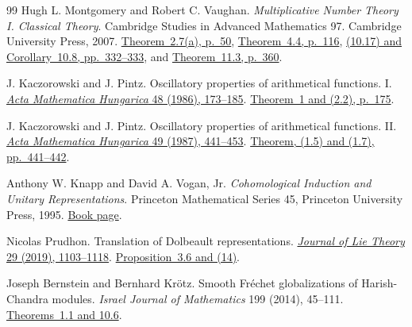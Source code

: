 \begin{thebibliography}{99}
Hugh L. Montgomery and Robert C. Vaughan.
\emph{Multiplicative Number Theory I. Classical Theory}.
Cambridge Studies in Advanced Mathematics 97. Cambridge University Press, 2007.
\href{https://personal.science.psu.edu/rcv4/personal/Publications/MNTI/06.0_pp_35_75_The_elementary_theory_of_arithmetic_functions.pdf\#page=16}
{Theorem~2.7(a), p.~50},
\href{https://personal.science.psu.edu/rcv4/personal/Publications/MNTI/08.0_pp_108_136_Primes_in_arithmetic_progressions_I.pdf\#page=9}
{Theorem~4.4, p.~116},
\href{https://personal.science.psu.edu/rcv4/personal/Publications/MNTI/14.0_pp_326_357_Analytic_properties_of_the_zeta_function_and_L-functions.pdf\#page=7}
{(10.17) and Corollary~10.8, pp.~332--333}, and
\href{https://personal.science.psu.edu/rcv4/personal/Publications/MNTI/15.0_pp_358_396_Primes_in_arithmetic_progressions_II.pdf\#page=3}
{Theorem~11.3, p.~360}.

J. Kaczorowski and J. Pintz.
Oscillatory properties of arithmetical functions. I.
\href{https://doi.org/10.1007/BF01949062}
{\emph{Acta Mathematica Hungarica} 48 (1986), 173--185}.
\href{https://personal.math.ubc.ca/~gerg/teaching/592-Fall2018/papers/1986.Kaczorowski_1.pdf\#page=3}
{Theorem~1 and (2.2), p.~175}.

J. Kaczorowski and J. Pintz.
Oscillatory properties of arithmetical functions. II.
\href{https://doi.org/10.1007/BF01951008}
{\emph{Acta Mathematica Hungarica} 49 (1987), 441--453}.
\href{https://personal.math.ubc.ca/~gerg/teaching/592-Fall2018/papers/1987.Kaczorowski_2.pdf\#page=1}
{Theorem, (1.5) and (1.7), pp.~441--442}.

Anthony W. Knapp and David A. Vogan, Jr.
\emph{Cohomological Induction and Unitary Representations}.
Princeton Mathematical Series 45, Princeton University Press, 1995.
\href{https://www.math.stonybrook.edu/~aknapp/books/kv.html}{Book page}.

Nicolas Prudhon.
Translation of Dolbeault representations.
\href{https://www.heldermann.de/JLT/JLT29/JLT294/jlt29050.htm}{\emph{Journal of Lie Theory} 29 (2019), 1103--1118}.
\href{https://prudhon.perso.math.cnrs.fr/fichiers/GeomTranslPrinciple-dolbeault.pdf}{Proposition~3.6 and (14)}.

Joseph Bernstein and Bernhard Kr\"otz.
Smooth Fr\'echet globalizations of Harish-Chandra modules.
\emph{Israel Journal of Mathematics} 199 (2014), 45--111.
\href{https://arxiv.org/pdf/0812.1684}{Theorems~1.1 and 10.6}.


\end{thebibliography}
